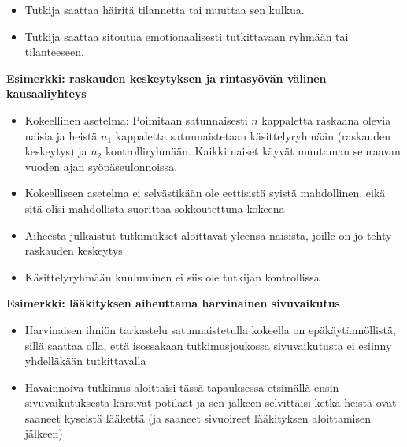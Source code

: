 \documentclass[
]{book}
\providecommand{\tightlist}{%
  \setlength{\itemsep}{0pt}\setlength{\parskip}{0pt}}
\begin{document}
\begin{itemize}
\begin{itemize}
    \begin{itemize}
    \tightlist
    \item
      Tutkija saattaa häiritä tilannetta tai muuttaa sen kulkua.
    \item
      Tutkija saattaa sitoutua emotionaalisesti tutkittavaan ryhmään tai tilanteeseen.
    \end{itemize}
  \end{itemize}
\end{itemize}

\begin{eblock}{}

\textbf{Esimerkki: raskauden keskeytyksen ja rintasyövän välinen kausaaliyhteys}

\begin{itemize}
\tightlist
\item
  Kokeellinen asetelma: Poimitaan satunnaisesti \(n\) kappaletta raskaana olevia naisia ja heistä \(n_1\) kappaletta satunnaistetaan käsittelyryhmään (raskauden keskeytys) ja \(n_2\) kontrolliryhmään. Kaikki naiset käyvät muutaman seuraavan vuoden ajan syöpäseulonnoissa.
\item
  Kokeelliseen asetelma ei selvästikään ole eettisistä syistä mahdollinen, eikä sitä olisi mahdollista suorittaa sokkoutettuna kokeena
\item
  Aiheesta julkaistut tutkimukset aloittavat yleensä naisista, joille on jo tehty raskauden keskeytys
\item
  Käsittelyryhmään kuuluminen ei siis ole tutkijan kontrollissa
\end{itemize}

\end{eblock}

\hfill\break

\begin{eblock}{}

\textbf{Esimerkki: lääkityksen aiheuttama harvinainen sivuvaikutus}

\begin{itemize}
\tightlist
\item
  Harvinaisen ilmiön tarkastelu satunnaistetulla kokeella on epäkäytännöllistä, sillä saattaa olla, että isossakaan tutkimusjoukossa sivuvaikutusta ei esiinny yhdelläkään tutkittavalla
\item
  Havainnoiva tutkimus aloittaisi tässä tapauksessa etsimällä ensin sivuvaikutuksesta kärsivät potilaat ja sen jälkeen selvittäisi ketkä heistä ovat saaneet kyseistä lääkettä (ja saaneet sivuoireet lääkityksen aloittamisen jälkeen)
\end{itemize}

\end{eblock}
\end{document}
